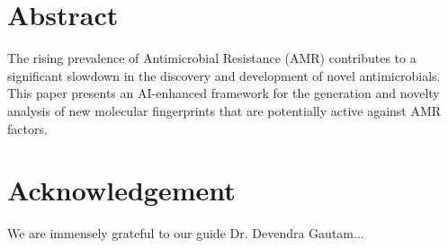 
\chapter*{Abstract}
The rising prevalence of Antimicrobial Resistance (AMR) contributes to a significant slowdown in the discovery and development of novel antimicrobials. This paper presents an AI-enhanced framework for the generation and novelty analysis of new molecular fingerprints that are potentially active against AMR factors.
\clearpage

\chapter*{Acknowledgement}
We are immensely grateful to our guide Dr. Devendra Gautam...
\clearpage
